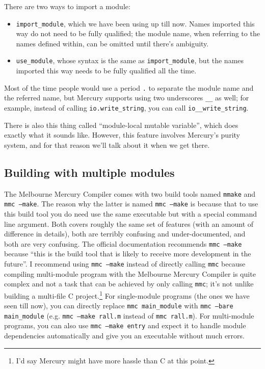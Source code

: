 There are two ways to import a module:

\begin{itemize}
\item \texttt{import\_module}, which we have been using up till now. Names imported this way do not need to be fully qualified; the module name, when referring to the names defined within, can be omitted until there's ambiguity.
\item \texttt{use\_module}, whose syntax is the same as \texttt{import\_module}, but the names imported this way needs to be fully qualified all the time.
\end{itemize}

Most of the time people would use a period \texttt{.} to separate the module name and the referred name, but Mercury supports using two underscores \texttt{\_\_} as well; for example, instead of calling \texttt{io.write\_string}, you can call \texttt{io\_\_write\_string}.

There is also this thing called ``module-local mutable variable'', which does exactly what it sounds like. However, this feature involves Mercury's purity system, and for that reason we'll talk about it when we get there.


\subsection{Building with multiple modules}

The Melbourne Mercury Compiler comes with two build tools named \texttt{mmake} and \texttt{mmc --make}. The reason why the latter is named \texttt{mmc --make} is because that to use this build tool you do need use the same executable but with a special command line argument. Both covers roughly the same set of features (with an amount of difference in details), both are terribly confusing and under-documented, and both are very confusing. The official documentation recommends \texttt{mmc --make} because ``this is the build tool that is likely to receive more development in the future''. I recommend using \texttt{mmc --make} instead of directly calling \texttt{mmc} because compiling multi-module program with the Melbourne Mercury Compiler is quite complex and not a task that can be achieved by only calling \texttt{mmc}; it's not unlike building a multi-file C project.\footnote{I'd say Mercury might have more hassle than C at this point.} For single-module programs (the ones we have seen till now), you can directly replace \texttt{mmc \lbrack main\_module\rbrack} with \texttt{mmc --bare \lbrack main\_module\rbrack} (e.g. \texttt{mmc --make rall.m} instead of \texttt{mmc rall.m}). For multi-module programs, you can also use \texttt{mmc --make \lbrack entry\rbrack} and expect it to handle module dependencies automatically and give you an executable without much errors.

